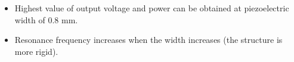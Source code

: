 \documentclass[compress]{beamer}
\begin{document}
\begin{frame}
{\begin{columns}[totalwidth=\textwidth]
\begin{column}{.49\textwidth}
   \end{column}
\end{columns}
\begin{columns}[totalwidth=\textwidth]
    \begin{column}{.49\textwidth}
   \begin{exampleblock}{}
   \begin{itemize}[label=$\bullet$, font=\small, leftmargin=*]
	\item Highest value of output voltage and power can be obtained at piezoelectric width of 0.8 mm.
	\item Resonance frequency increases when the width increases (the structure is more rigid).
	\end{itemize}
	\end{exampleblock}
   \end{column}
\end{columns}   
}
\end{frame}
\end{document}

